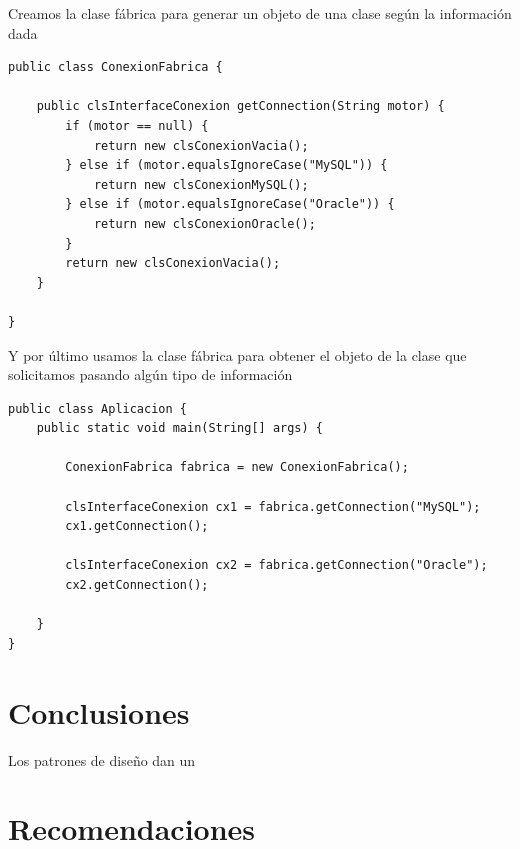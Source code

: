 \documentclass[twoside,twocolumn]{article}
\begin{document}
Creamos la clase fábrica para generar un objeto de una clase según la información dada
\lstset{breaklines=true,style=sharpc}
\begin{lstlisting}
public class ConexionFabrica {

    public clsInterfaceConexion getConnection(String motor) {
        if (motor == null) {
            return new clsConexionVacia();
        } else if (motor.equalsIgnoreCase("MySQL")) {
            return new clsConexionMySQL();
        } else if (motor.equalsIgnoreCase("Oracle")) {
            return new clsConexionOracle();
        }
        return new clsConexionVacia();
    }

}
\end{lstlisting}



Y por último usamos la clase fábrica para obtener el objeto de la clase que solicitamos pasando algún tipo de información
\lstset{breaklines=true,style=sharpc}
\begin{lstlisting}
public class Aplicacion {
    public static void main(String[] args) {

        ConexionFabrica fabrica = new ConexionFabrica();

        clsInterfaceConexion cx1 = fabrica.getConnection("MySQL");
        cx1.getConnection();

        clsInterfaceConexion cx2 = fabrica.getConnection("Oracle");
        cx2.getConnection();

    }
}
\end{lstlisting}





\section{Conclusiones}

Los patrones de diseño dan un


\section{Recomendaciones}
\end{document}
